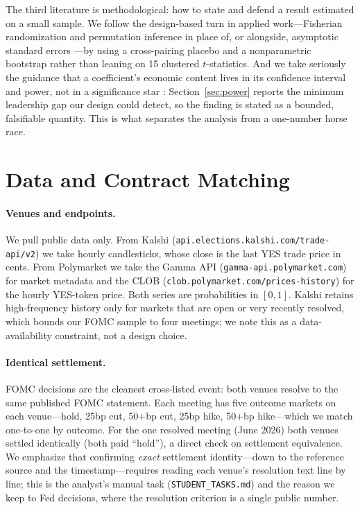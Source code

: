 \documentclass[12pt]{article}
\begin{document}
The third literature is methodological: how to state and defend a result estimated on a small
sample. We follow the design-based turn in applied work---Fisherian randomization and permutation
inference in place of, or alongside, asymptotic standard errors \citep{young2019}---by using a
cross-pairing placebo and a nonparametric bootstrap rather than leaning on 15 clustered
$t$-statistics. And we take seriously the guidance that a coefficient's economic content lives in
its confidence interval and power, not in a significance star \citep{abadie2020}: Section~\ref{sec:power}
reports the minimum leadership gap our design could detect, so the finding is stated as a bounded,
falsifiable quantity. This is what separates the analysis from a one-number horse race.

\section{Data and Contract Matching}\label{sec:data}
\paragraph{Venues and endpoints.} We pull public data only. From Kalshi
(\texttt{api.elections.kalshi.com/trade-api/v2}) we take hourly candlesticks, whose close
is the last YES trade price in cents. From Polymarket we take the Gamma API
(\texttt{gamma-api.polymarket.com}) for market metadata and the CLOB
(\texttt{clob.polymarket.com/prices-history}) for the hourly YES-token price. Both series
are probabilities in $[0,1]$. Kalshi retains high-frequency history only for markets that
are open or very recently resolved, which bounds our FOMC sample to four meetings; we note
this as a data-availability constraint, not a design choice.

\paragraph{Identical settlement.} FOMC decisions are the cleanest cross-listed event: both
venues resolve to the same published FOMC statement. Each meeting has five outcome markets
on each venue---hold, 25bp cut, 50+bp cut, 25bp hike, 50+bp hike---which we match one-to-one
by outcome. For the one resolved meeting (June 2026) both venues settled identically (both
paid ``hold''), a direct check on settlement equivalence. We emphasize that confirming
\emph{exact} settlement identity---down to the reference source and the timestamp---requires
reading each venue's resolution text line by line; this is the analyst's manual task
(\texttt{STUDENT\_TASKS.md}) and the reason we keep to Fed decisions, where the resolution
criterion is a single public number.
\end{document}
